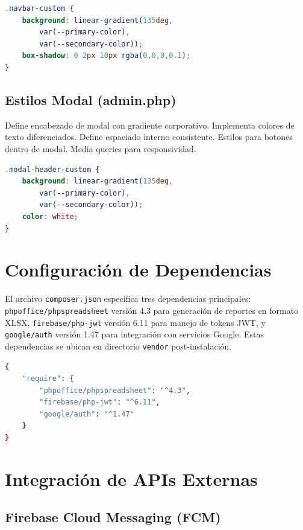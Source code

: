 \documentclass[12pt,a4paper]{article}
\begin{document}
\begin{lstlisting}[language=CSS,caption={Navbar custom}]
.navbar-custom {
    background: linear-gradient(135deg, 
        var(--primary-color), 
        var(--secondary-color));
    box-shadow: 0 2px 10px rgba(0,0,0,0.1);
}
\end{lstlisting}

\subsection{Estilos Modal (admin.php)}

Define encabezado de modal con gradiente corporativo. Implementa colores de texto diferenciados. Define espaciado interno consistente. Estilos para botones dentro de modal. Media queries para responsividad.

\begin{lstlisting}[language=CSS,caption={Modal header}]
.modal-header-custom {
    background: linear-gradient(135deg, 
        var(--primary-color), 
        var(--secondary-color));
    color: white;
}
\end{lstlisting}

\section{Configuración de Dependencias}

El archivo \texttt{composer.json} especifica tres dependencias principales: \texttt{phpoffice/phpspreadsheet} versión 4.3 para generación de reportes en formato XLSX, \texttt{firebase/php-jwt} versión 6.11 para manejo de tokens JWT, y \texttt{google/auth} versión 1.47 para integración con servicios Google. Estas dependencias se ubican en directorio \texttt{vendor} post-instalación.

\begin{lstlisting}[language=bash,caption={Dependencias Composer}]
{
    "require": {
        "phpoffice/phpspreadsheet": "^4.3",
        "firebase/php-jwt": "^6.11",
        "google/auth": "^1.47"
    }
}
\end{lstlisting}

\section{Integración de APIs Externas}

\subsection{Firebase Cloud Messaging (FCM)}
\end{document}
